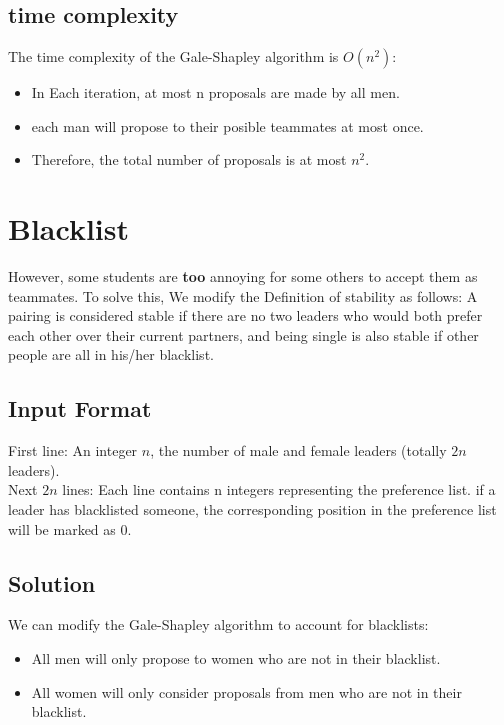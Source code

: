 \documentclass[a4paper,12pt]{article}
\begin{document}
\subsection{time complexity}
The time complexity of the Gale-Shapley algorithm is $O(n^2)$:
\begin{itemize}
    \item In Each iteration, at most n proposals are made by all men.
    \item each man will propose to their posible teammates at most once.
    \item Therefore, the total number of proposals is at most $n^2$.
\end{itemize}

\section{Blacklist}
However, some students are \textbf{too} annoying for some others to accept them as teammates.
To solve this, We modify the Definition of stability as follows:
A pairing is considered stable if there are no two leaders who would both prefer each other over their current partners,
and being single is also stable if other people are all in his/her blacklist.
\subsection{Input Format}
First line: An integer $n$, the number of male and female leaders (totally $2n$ leaders).\\
Next $2n$ lines: Each line contains n integers representing the preference list. if a leader has blacklisted someone,
the corresponding position in the preference list will be marked as 0.
\subsection{Solution}
We can modify the Gale-Shapley algorithm to account for blacklists:
\begin{itemize}
    \item All men will only propose to women who are not in their blacklist.
    \item All women will only consider proposals from men who are not in their blacklist.
\end{itemize}
\end{document}
